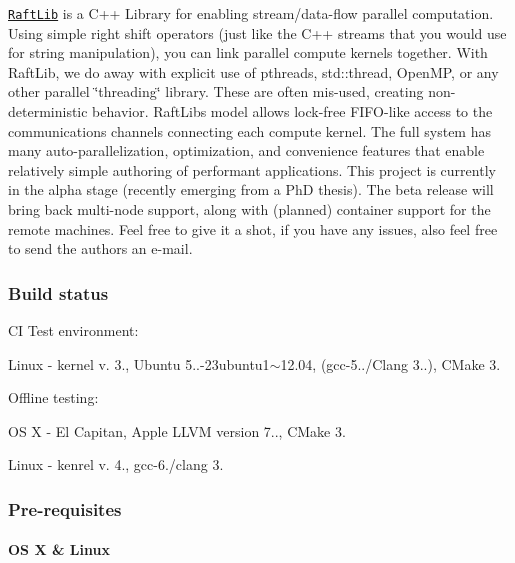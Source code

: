 \href{http://raftlib.io}{\tt Raft\+Lib} is a C++ Library for enabling stream/data-\/flow parallel computation. Using simple right shift operators (just like the C++ streams that you would use for string manipulation), you can link parallel compute kernels together. With Raft\+Lib, we do away with explicit use of pthreads, std\+::thread, Open\+MP, or any other parallel \char`\"{}threading\char`\"{} library. These are often mis-\/used, creating non-\/deterministic behavior. Raft\+Lib\textquotesingle{}s model allows lock-\/free F\+I\+F\+O-\/like access to the communications channels connecting each compute kernel. The full system has many auto-\/parallelization, optimization, and convenience features that enable relatively simple authoring of performant applications. This project is currently in the alpha stage (recently emerging from a PhD thesis). The beta release will bring back multi-\/node support, along with (planned) container support for the remote machines. Feel free to give it a shot, if you have any issues, also feel free to send the authors an e-\/mail. 



\subsubsection*{Build status}

\href{https://travis-ci.org/RaftLib/RaftLib}{\tt }

CI Test environment\+:
\begin{DoxyItemize}
\item Linux -\/ kernel v. 3., Ubuntu 5..-\/23ubuntu1$\sim$12.04, (gcc-\/5../\+Clang 3..), C\+Make 3.
\end{DoxyItemize}

Offline testing\+:
\begin{DoxyItemize}
\item OS X -\/ El Capitan, Apple L\+L\+VM version 7.., C\+Make 3.
\item Linux -\/ kenrel v. 4., gcc-\/6./clang 3.
\end{DoxyItemize}

\subsubsection*{Pre-\/requisites}

\paragraph*{OS X \& Linux}

